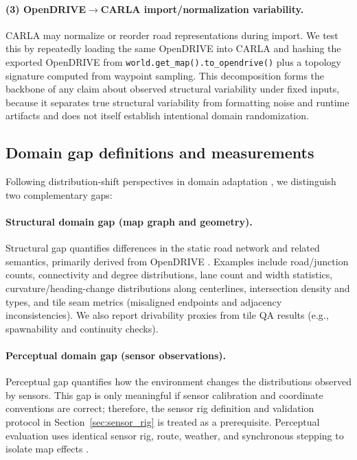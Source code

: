 \paragraph{(3) OpenDRIVE$\rightarrow$CARLA import/normalization variability.}
CARLA may normalize or reorder road representations during import.
We test this by repeatedly loading the same OpenDRIVE into CARLA and hashing the exported OpenDRIVE from \texttt{world.get\_map().to\_opendrive()} plus a topology signature computed from waypoint sampling.
This decomposition forms the backbone of any claim about observed structural variability under fixed inputs, because it separates true structural variability from formatting noise and runtime artifacts and does not itself establish intentional domain randomization.

\subsection{Domain gap definitions and measurements}
\label{sec:domain_gap_definitions}
Following distribution-shift perspectives in domain adaptation \cite{ben_david2010domain}, we distinguish two complementary gaps:

\paragraph{Structural domain gap (map graph and geometry).}
Structural gap quantifies differences in the static road network and related semantics, primarily derived from OpenDRIVE \cite{asam_opendrive_1_7}.
Examples include road/junction counts, connectivity and degree distributions, lane count and width statistics, curvature/heading-change distributions along centerlines, intersection density and types, and tile seam metrics (misaligned endpoints and adjacency inconsistencies).
We also report drivability proxies from tile QA results (e.g., spawnability and continuity checks).

\paragraph{Perceptual domain gap (sensor observations).}
Perceptual gap quantifies how the environment changes the distributions observed by sensors.
This gap is only meaningful if sensor calibration and coordinate conventions are correct; therefore, the sensor rig definition and validation protocol in Section~\ref{sec:sensor_rig} is treated as a prerequisite.
Perceptual evaluation uses identical sensor rig, route, weather, and synchronous stepping to isolate map effects \cite{dosovitskiy2017carla}.

